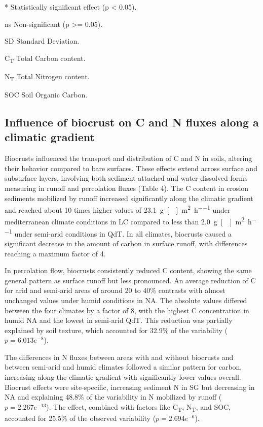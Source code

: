 \begin{table}[htbp]
\begin{threeparttable}
\begin{tablenotes}
        \item[*] Statistically significant effect (p < 0.05).
        \item[ns] Non-significant (p >= 0.05).
        \item[SD] Standard Deviation.
        \item[C\textsubscript{T}] Total Carbon content.
        \item[N\textsubscript{T}] Total Nitrogen content.
        \item[SOC] Soil Organic Carbon.
      \end{tablenotes}
    \end{threeparttable}
  \end{table}

\subsection{Influence of biocrust on C and N fluxes along a climatic gradient}

Biocrusts influenced the transport and distribution of C and N in soils, altering their behavior compared to bare surfaces. These effects extend across surface and subsurface layers, involving both sediment-attached and water-dissolved forms measuring in runoff and percolation fluxes (Table 4). The C content in erosion sediments mobilized by runoff increased significantly along the climatic gradient and reached about 10 times higher values of \SI{23.1}{\gram[]\per\square\metre\per\hour} under mediterranean climate conditions in LC compared to less than \SI{2.0}{\gram[]\per\square\metre\per\hour} under semi-arid conditions in QdT. In all climates, biocrusts caused a significant decrease in the amount of carbon in surface runoff, with differences reaching a maximum factor of 4.
 
In percolation flow, biocrusts consistently reduced C content, showing the same general pattern as surface runoff but less pronounced. An average reduction of C for arid and semi-arid areas of around 20 to 40\% contrasts with almost unchanged values under humid conditions in NA. The absolute values differed between the four climates by a factor of 8, with the highest C concentration in humid NA and the lowest in semi-arid QdT. This reduction was partially explained by soil texture, which accounted for 32.9\% of the variability ($p = 6.013e^{-8}$).

The differences in N fluxes between areas with and without biocrusts and between semi-arid and humid climates followed a similar pattern for carbon, increasing along the climatic gradient with significantly lower values overall. Biocrust effects were site-specific, increasing sediment N in SG but decreasing in NA and explaining 48.8\% of the variability in N mobilized by runoff ($p = 2.267e^{-13}$). The effect, combined with factors like C\textsubscript{T}, N\textsubscript{T}, and SOC, accounted for 25.5\% of the observed variability ($p = 2.694e^{-6}$).

